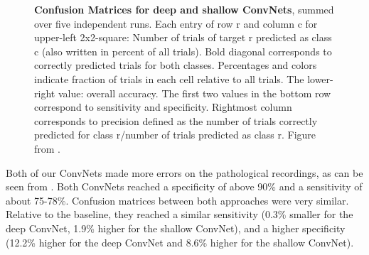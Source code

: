 \begin{figure}[htbp]
\myfloatalign
{}\hfill
{}
\caption[Confusion Matrices for deep and shallow ConvNets]{\textbf{Confusion Matrices for deep and shallow ConvNets}, summed over five independent runs.
Each entry of row r and column c for upper-left 2x2-square: Number of trials of target r predicted as class c (also written in percent of all trials).
Bold diagonal corresponds to correctly predicted trials for both classes. Percentages and colors indicate fraction of trials in each cell relative to all trials.
The lower-right value: overall accuracy. The first two values in the bottom row correspond to sensitivity and specificity.
Rightmost column corresponds to precision defined as the number of trials correctly predicted for class r/number of trials predicted as class r. Figure from \citet{schirrmeisterdeeppathology}.}
\label{conf-mat-pathology-fig}
\end{figure}

    Both of our ConvNets made more errors on the pathological recordings, as
can be seen from . Both
ConvNets reached a specificity of above 90\% and a sensitivity of about
75-78\%. Confusion matrices between both approaches were very similar.
Relative to the baseline, they reached a similar sensitivity (0.3\%
smaller for the deep ConvNet, 1.9\% higher for the shallow ConvNet), and
a higher specificity (12.2\% higher for the deep ConvNet and 8.6\%
higher for the shallow ConvNet).

